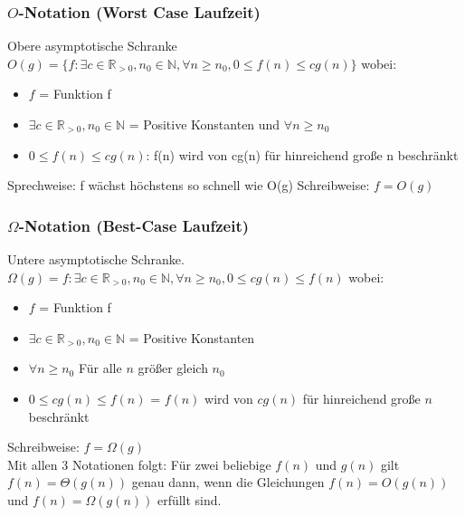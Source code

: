 \documentclass[jou,apacite]{apa6}
\begin{document}
\subsubsection{$O$-Notation (Worst Case Laufzeit)} 
Obere asymptotische Schranke\\
$O(g) = \{ f : \exists c \in \mathbb{R}_{>0},n_0 \in \mathbb{N}, \forall n \geq n_0,0 \leq f(n) \leq cg(n) \} $
wobei:
\begin{itemize}
    \item $f$ = Funktion f
    \item $\exists c \in \mathbb{R}_{>0},n_0 \in \mathbb{N}$ = Positive Konstanten und $\forall n \geq n_0$
    \item $0 \leq f(n) \leq cg(n)$: f(n) wird von cg(n) für hinreichend große n beschränkt
\end{itemize}
Sprechweise: f wächst höchstens so schnell wie O(g)
Schreibweise: $f = O(g)$

\subsubsection{$\Omega$-Notation (Best-Case Laufzeit)} 
Untere asymptotische Schranke.\\
$\Omega(g)={f: \exists c \in \mathbb{R}_{>0}, n_{0} \in \mathbb{N}, \forall n \geq n_{0},0 \leq cg(n) \leq f(n)}$ wobei:
\begin{itemize}
    \item $f$ = Funktion f
    \item $\exists c \in \mathbb{R}_{>0}, n_{0} \in \mathbb{N}$ = Positive Konstanten
    \item $\forall n \geq n_{0}$ Für alle $n$ größer gleich $n_{0}$
    \item $0 \leq cg(n) \leq f(n)$ = $f(n)$ wird von $cg(n)$ für hinreichend große $n$ beschränkt
\end{itemize}
Schreibweise: $f=\Omega(g)$ \\
Mit allen 3 Notationen folgt: Für zwei beliebige $f(n)$ und $g(n)$ gilt $f(n)=\Theta(g(n))$ genau dann, wenn die Gleichungen $f(n)=O(g(n))$ und $f(n) = \Omega(g(n))$ erfüllt sind.
\end{document}
